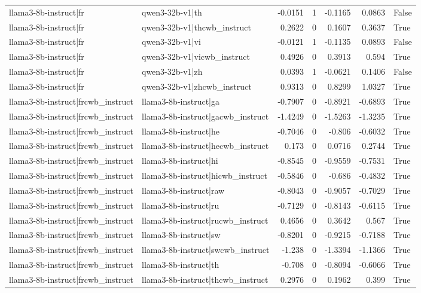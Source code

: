 \begin{table}
\begin{tabular}{l l r r r r l}
llama3-8b-instruct|fr & qwen3-32b-v1|th & -0.0151 & 1 & -0.1165 & 0.0863 & False \\
llama3-8b-instruct|fr & qwen3-32b-v1|thcwb_instruct & 0.2622 & 0 & 0.1607 & 0.3637 & True \\
llama3-8b-instruct|fr & qwen3-32b-v1|vi & -0.0121 & 1 & -0.1135 & 0.0893 & False \\
llama3-8b-instruct|fr & qwen3-32b-v1|vicwb_instruct & 0.4926 & 0 & 0.3913 & 0.594 & True \\
llama3-8b-instruct|fr & qwen3-32b-v1|zh & 0.0393 & 1 & -0.0621 & 0.1406 & False \\
llama3-8b-instruct|fr & qwen3-32b-v1|zhcwb_instruct & 0.9313 & 0 & 0.8299 & 1.0327 & True \\
llama3-8b-instruct|frcwb_instruct & llama3-8b-instruct|ga & -0.7907 & 0 & -0.8921 & -0.6893 & True \\
llama3-8b-instruct|frcwb_instruct & llama3-8b-instruct|gacwb_instruct & -1.4249 & 0 & -1.5263 & -1.3235 & True \\
llama3-8b-instruct|frcwb_instruct & llama3-8b-instruct|he & -0.7046 & 0 & -0.806 & -0.6032 & True \\
llama3-8b-instruct|frcwb_instruct & llama3-8b-instruct|hecwb_instruct & 0.173 & 0 & 0.0716 & 0.2744 & True \\
llama3-8b-instruct|frcwb_instruct & llama3-8b-instruct|hi & -0.8545 & 0 & -0.9559 & -0.7531 & True \\
llama3-8b-instruct|frcwb_instruct & llama3-8b-instruct|hicwb_instruct & -0.5846 & 0 & -0.686 & -0.4832 & True \\
llama3-8b-instruct|frcwb_instruct & llama3-8b-instruct|raw & -0.8043 & 0 & -0.9057 & -0.7029 & True \\
llama3-8b-instruct|frcwb_instruct & llama3-8b-instruct|ru & -0.7129 & 0 & -0.8143 & -0.6115 & True \\
llama3-8b-instruct|frcwb_instruct & llama3-8b-instruct|rucwb_instruct & 0.4656 & 0 & 0.3642 & 0.567 & True \\
llama3-8b-instruct|frcwb_instruct & llama3-8b-instruct|sw & -0.8201 & 0 & -0.9215 & -0.7188 & True \\
llama3-8b-instruct|frcwb_instruct & llama3-8b-instruct|swcwb_instruct & -1.238 & 0 & -1.3394 & -1.1366 & True \\
llama3-8b-instruct|frcwb_instruct & llama3-8b-instruct|th & -0.708 & 0 & -0.8094 & -0.6066 & True \\
llama3-8b-instruct|frcwb_instruct & llama3-8b-instruct|thcwb_instruct & 0.2976 & 0 & 0.1962 & 0.399 & True \\

\end{tabular}
\end{table}
